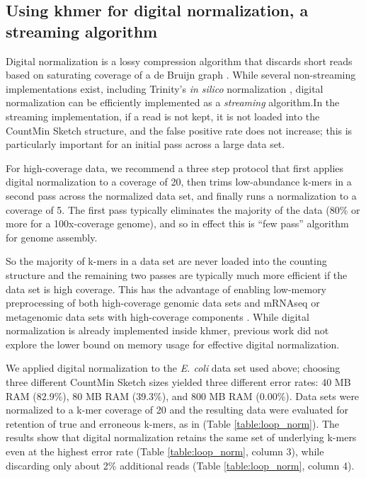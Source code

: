 \documentclass[10pt]{article}
\begin{document}
\subsection*{Using khmer for digital normalization, a streaming algorithm}

Digital normalization is a lossy compression algorithm that discards
short reads based on saturating coverage of a de Bruijn graph
\cite{Brown2012}.  While several non-streaming implementations exist,
including Trinity's {\em in silico} normalization
\cite{Haas2013,Brown2012blog}, digital normalization can be
efficiently implemented as a {\em streaming} algorithm.In the
streaming implementation, if a read is not kept, it is not loaded into
the CountMin Sketch structure, and the false positive rate does not
increase; this is particularly important for an initial pass across a
large data set.

For high-coverage data, we recommend a three step protocol that
first applies digital normalization to a coverage of 20, then trims
low-abundance k-mers in a second pass across the normalized data set,
and finally runs a normalization to a coverage of 5. The
first pass typically eliminates the majority of the data (80\% or more
for a 100x-coverage genome), and so in effect this is ``few pass''
algorithm for genome assembly.

So the majority of k-mers in a data set are never
loaded into the counting structure and the remaining two passes are
typically much more efficient if the data set is high coverage. This
has the advantage of enabling low-memory preprocessing of both
high-coverage genomic data sets and mRNAseq or metagenomic data sets
with high-coverage components \cite{Brown2012, Howe2012}.  While
digital normalization is already implemented inside khmer, previous
work did not explore the lower bound on memory usage for effective
digital normalization.

We applied digital normalization to the {\em E. coli} data set used
above; choosing three different CountMin Sketch sizes yielded three different
error rates: 40 MB RAM (82.9\%), 80 MB RAM (39.3\%), and 800 MB RAM
(0.00\%).  Data sets were normalized to a k-mer coverage of 20 and the
resulting data were evaluated for retention of true and erroneous
k-mers, as in \cite{Brown2012} (Table \ref{table:loop_norm}).  The results show that
digital normalization retains the same set of underlying
k-mers even at the highest error rate (Table \ref{table:loop_norm}, column 3), 
while discarding only about 2\% additional reads (Table \ref{table:loop_norm}, column 4).
\end{document}
